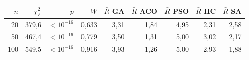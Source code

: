 \begin{tabular}{rrrrrrrrr}
\toprule
$n$ & $\chi^2_F$ & $p$ & $W$ & $\bar R$ GA & $\bar R$ ACO & $\bar R$ PSO & $\bar R$ HC & $\bar R$ SA \\
\midrule
20 & 379{,}6 & $<10^{-16}$ & 0{,}633 & 3{,}31 & 1{,}84 & 4{,}95 & 2{,}31 & 2{,}58 \\
\midrule
50 & 467{,}4 & $<10^{-16}$ & 0{,}779 & 3{,}50 & 1{,}31 & 5{,}00 & 3{,}02 & 2{,}17 \\
\midrule
100 & 549{,}5 & $<10^{-16}$ & 0{,}916 & 3{,}93 & 1{,}26 & 5{,}00 & 2{,}93 & 1{,}88 \\
\bottomrule
\end{tabular}
